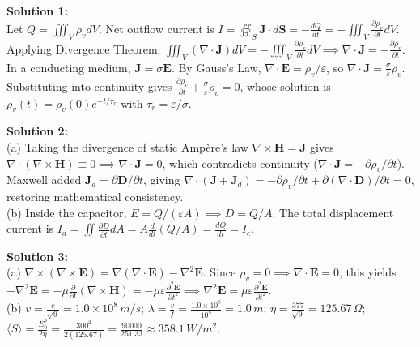 \begin{solutionbox}
\textbf{Solution 1:}\\
Let $Q = \iiint_V \rho_v dV$. Net outflow current is $I = \oiint_S \mathbf{J} \cdot d\mathbf{S} = -\frac{dQ}{dt} = -\iiint_V \frac{\partial \rho_v}{\partial t} dV$. Applying Divergence Theorem: $\iiint_V (\nabla \cdot \mathbf{J}) dV = -\iiint_V \frac{\partial \rho_v}{\partial t} dV \implies \nabla \cdot \mathbf{J} = -\frac{\partial \rho_v}{\partial t}$.\\
In a conducting medium, $\mathbf{J} = \sigma \mathbf{E}$. By Gauss's Law, $\nabla \cdot \mathbf{E} = \rho_v / \varepsilon$, so $\nabla \cdot \mathbf{J} = \frac{\sigma}{\varepsilon} \rho_v$. Substituting into continuity gives $\frac{\partial \rho_v}{\partial t} + \frac{\sigma}{\varepsilon}\rho_v = 0$, whose solution is $\rho_v(t) = \rho_v(0) e^{-t/\tau_r}$ with $\tau_r = \varepsilon/\sigma$.

\vspace{0.3cm}
\textbf{Solution 2:}\\
(a) Taking the divergence of static Ampère's law $\nabla \times \mathbf{H} = \mathbf{J}$ gives $\nabla \cdot (\nabla \times \mathbf{H}) \equiv 0 \implies \nabla \cdot \mathbf{J} = 0$, which contradicts continuity ($\nabla \cdot \mathbf{J} = -\partial \rho_v/\partial t$). Maxwell added $\mathbf{J}_d = \partial \mathbf{D}/\partial t$, giving $\nabla \cdot (\mathbf{J} + \mathbf{J}_d) = -\partial \rho_v/\partial t + \partial(\nabla \cdot \mathbf{D})/\partial t = 0$, restoring mathematical consistency.\\
(b) Inside the capacitor, $E = Q/(\varepsilon A) \implies D = Q/A$. The total displacement current is $I_d = \iint \frac{\partial D}{\partial t} dA = A \frac{d}{dt}(Q/A) = \frac{dQ}{dt} = I_c$.

\vspace{0.3cm}
\textbf{Solution 3:}\\
(a) $\nabla \times (\nabla \times \mathbf{E}) = \nabla(\nabla \cdot \mathbf{E}) - \nabla^2 \mathbf{E}$. Since $\rho_v = 0 \implies \nabla \cdot \mathbf{E} = 0$, this yields $-\nabla^2 \mathbf{E} = -\mu \frac{\partial}{\partial t}(\nabla \times \mathbf{H}) = -\mu \varepsilon \frac{\partial^2 \mathbf{E}}{\partial t^2} \implies \nabla^2 \mathbf{E} = \mu \varepsilon \frac{\partial^2 \mathbf{E}}{\partial t^2}$.\\
(b) $v = \frac{c}{\sqrt{9}} = 1.0 \times 10^8\,\si{m/s}$; $\lambda = \frac{v}{f} = \frac{1.0 \times 10^8}{10^8} = 1.0\,\si{m}$; $\eta = \frac{377}{\sqrt{9}} = 125.67\,\Omega$; $\langle S \rangle = \frac{E_0^2}{2\eta} = \frac{300^2}{2(125.67)} = \frac{90000}{251.33} \approx 358.1\,\si{W/m^2}$.


\end{solutionbox}
